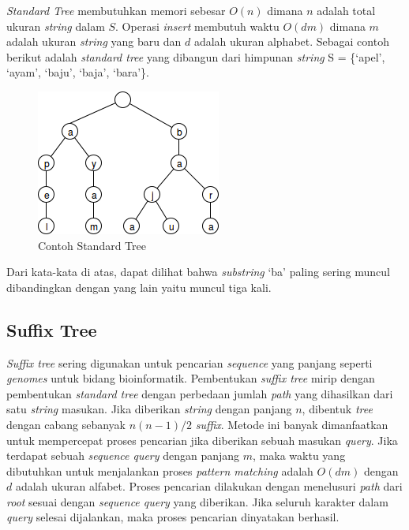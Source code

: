 \textit{Standard Tree} membutuhkan memori sebesar $O(n)$ dimana $n$ adalah total ukuran \textit{string} dalam $S$. Operasi \textit{insert} membutuh waktu $O(dm)$ dimana $m$ adalah ukuran \textit{string} yang baru dan $d$ adalah ukuran alphabet. Sebagai contoh berikut adalah \textit{standard tree} yang dibangun dari himpunan \textit{string} S = \{`apel', `ayam', `baju', `baja', `bara'\}.
\begin{figure}
    \centering
    \includegraphics[scale=0.6]{pics/Contoh-StandardTrie}
    \caption{Contoh Standard Tree}
    \label{fig:contoh-standard-tree}
\end{figure}

\noindent Dari kata-kata di atas, dapat dilihat bahwa \textit{substring} `ba' paling sering muncul dibandingkan dengan yang lain yaitu muncul tiga kali.

\subsection{Suffix Tree} \label{sec:suffix-tree}
\textit{Suffix tree} sering digunakan untuk pencarian \textit{sequence} yang panjang seperti \textit{genomes} untuk bidang bioinformatik. Pembentukan \textit{suffix tree} mirip dengan pembentukan \textit{standard tree} dengan perbedaan jumlah \textit{path} yang dihasilkan dari satu \textit{string} masukan. Jika diberikan \textit{string} dengan panjang $n$, dibentuk \textit{tree} dengan cabang sebanyak $n(n-1)/2$ \textit{suffix}.  Metode ini banyak dimanfaatkan untuk mempercepat proses pencarian jika diberikan sebuah masukan \textit{query}. Jika terdapat sebuah \textit{sequence query} dengan panjang $m$, maka waktu yang dibutuhkan untuk menjalankan proses \textit{pattern matching} adalah $O(dm)$ dengan $d$ adalah ukuran alfabet. Proses pencarian dilakukan dengan menelusuri \textit{path} dari \textit{root} sesuai dengan \textit{sequence query} yang diberikan. Jika seluruh karakter dalam \textit{query} selesai dijalankan, maka proses pencarian dinyatakan berhasil. 

